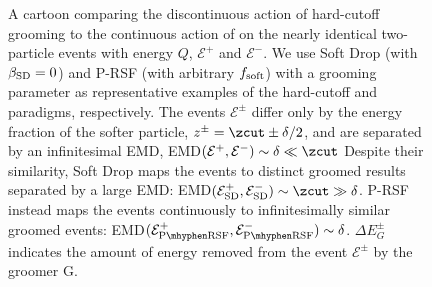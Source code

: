 \documentclass[letterpaper,11pt]{article}
\begin{document}
\begin{figure}[]
{
}

\caption{
A cartoon comparing the discontinuous action of hard-cutoff grooming to the continuous action of \PIRANHA{} on the nearly identical two-particle events with energy \(Q\), \(\mathcal{E}^+\) and \(\mathcal{E}^-\).
%
We use Soft Drop (with \(\beta_{\rm SD} = 0\)) and P-RSF (with arbitrary \(f_{\rm soft}\)) with a grooming parameter \zcut{} as representative examples of the hard-cutoff and \PIRANHA{} paradigms, respectively.
The events \(\mathcal E^\pm\) differ only by the energy fraction of the softer particle,
%
\(
z^\pm = \zcut \pm \delta/2
\),
%
and are separated by an infinitesimal EMD,
%
EMD\(
(\mathcal{E}^+, \mathcal{E}^-)
\sim \delta \ll \zcut
\)
Despite their similarity, Soft Drop maps the events to distinct groomed results separated by a large EMD:
%
%
%
EMD\(
(\mathcal{E}_{\rm SD}^+, \mathcal{E}_{\rm SD}^-)
\sim \zcut \gg \delta
\).
P-RSF instead
maps the events continuously to infinitesimally similar groomed events:
%
EMD\(
(\mathcal{E}_{\rm P\mhyphen RSF}^+,
\mathcal{E}_{\rm P\mhyphen RSF}^-)
\sim \delta
\).
%
\(\Delta E^\pm_G\) indicates the amount of energy removed from the event \(\mathcal E^\pm\) by the groomer G.
}
\label{fig:groomcartoon}
\end{figure}
\end{document}
